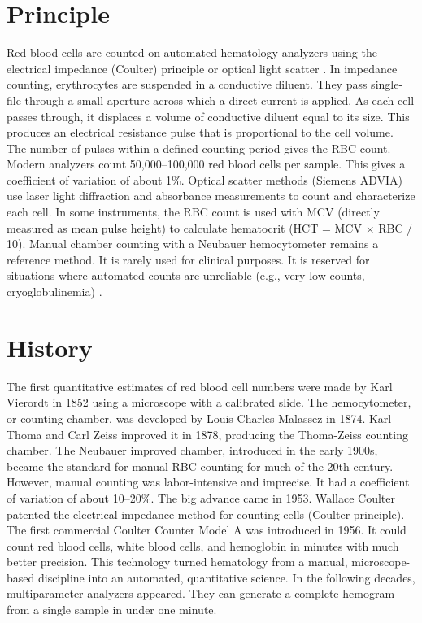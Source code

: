 \section*{Principle}
Red blood cells are counted on automated hematology analyzers using the electrical impedance (Coulter) principle or optical light scatter \cite{tietz2012textbook}. In impedance counting, erythrocytes are suspended in a conductive diluent. They pass single-file through a small aperture across which a direct current is applied. As each cell passes through, it displaces a volume of conductive diluent equal to its size. This produces an electrical resistance pulse that is proportional to the cell volume. The number of pulses within a defined counting period gives the RBC count. Modern analyzers count 50,000--100,000 red blood cells per sample. This gives a coefficient of variation of about 1\%. Optical scatter methods (Siemens ADVIA) use laser light diffraction and absorbance measurements to count and characterize each cell. In some instruments, the RBC count is used with MCV (directly measured as mean pulse height) to calculate hematocrit (HCT = MCV $\times$ RBC / 10). Manual chamber counting with a Neubauer hemocytometer remains a reference method. It is rarely used for clinical purposes. It is reserved for situations where automated counts are unreliable (e.g., very low counts, cryoglobulinemia) \cite{bain2017dacie}.

\section*{History}
The first quantitative estimates of red blood cell numbers were made by Karl Vierordt in 1852 using a microscope with a calibrated slide. The hemocytometer, or counting chamber, was developed by Louis-Charles Malassez in 1874. Karl Thoma and Carl Zeiss improved it in 1878, producing the Thoma-Zeiss counting chamber. The Neubauer improved chamber, introduced in the early 1900s, became the standard for manual RBC counting for much of the 20th century. However, manual counting was labor-intensive and imprecise. It had a coefficient of variation of about 10--20\%. The big advance came in 1953. Wallace Coulter patented the electrical impedance method for counting cells (Coulter principle). The first commercial Coulter Counter Model A was introduced in 1956. It could count red blood cells, white blood cells, and hemoglobin in minutes with much better precision. This technology turned hematology from a manual, microscope-based discipline into an automated, quantitative science. In the following decades, multiparameter analyzers appeared. They can generate a complete hemogram from a single sample in under one minute.

